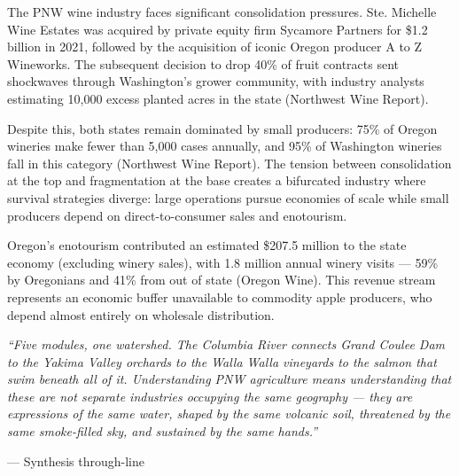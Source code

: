 \documentclass[11pt,letterpaper]{article}
\begin{document}
The PNW wine industry faces significant consolidation pressures. Ste. Michelle Wine Estates was acquired by private equity firm Sycamore Partners for \$1.2 billion in 2021, followed by the acquisition of iconic Oregon producer A to Z Wineworks. The subsequent decision to drop 40\% of fruit contracts sent shockwaves through Washington's grower community, with industry analysts estimating 10,000 excess planted acres in the state (Northwest Wine Report).

Despite this, both states remain dominated by small producers: 75\% of Oregon wineries make fewer than 5,000 cases annually, and 95\% of Washington wineries fall in this category (Northwest Wine Report). The tension between consolidation at the top and fragmentation at the base creates a bifurcated industry where survival strategies diverge: large operations pursue economies of scale while small producers depend on direct-to-consumer sales and enotourism.

Oregon's enotourism contributed an estimated \$207.5 million to the state economy (excluding winery sales), with 1.8 million annual winery visits --- 59\% by Oregonians and 41\% from out of state (Oregon Wine). This revenue stream represents an economic buffer unavailable to commodity apple producers, who depend almost entirely on wholesale distribution.

\vspace{2em}

\begin{quotebox}
\textit{``Five modules, one watershed. The Columbia River connects Grand Coulee Dam to the Yakima Valley orchards to the Walla Walla vineyards to the salmon that swim beneath all of it. Understanding PNW agriculture means understanding that these are not separate industries occupying the same geography --- they are expressions of the same water, shaped by the same volcanic soil, threatened by the same smoke-filled sky, and sustained by the same hands.''}

\vspace{0.5em}
\hfill --- Synthesis through-line
\end{quotebox}
\end{document}

